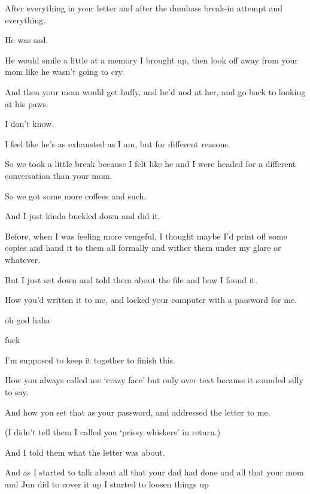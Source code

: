 {
After everything in your letter and
after the dumbass break-in attempt and everything.

He was sad.

He would smile a little at a memory
I brought up, then look off away from your mom like he wasn't going to
cry.

And then your mom would get huffy,
and he'd nod at her, and go back to looking at his paws.

I don't know.

I feel like he's as exhausted as I
am, but for different reasons.

So we took a little break because I
felt like he and I were headed for a different conversation than your
mom.

So we got some more coffees and
such.

And I just kinda buckled down and
did it.

Before, when I was feeling more
vengeful, I thought maybe I'd print off some copies and hand it to them
all formally and wither them under my glare or whatever.

But I just sat down and told them
about the file and how I found it.

How you'd written it to me, and
locked your computer with a password for me.

oh god haha

fuck

I'm supposed to keep it together to
finish this.

How you always called me `crazy
face' but only over text because it sounded silly to say.

And how you set that as your
password, and addressed the letter to me.

(I didn't tell them I called you
`prissy whiskers' in return.)

And I told them what the letter was
about.

And as I started to talk about all
that your dad had done and all that your mom and Jun did to cover it up
I started to loosen things up

}
